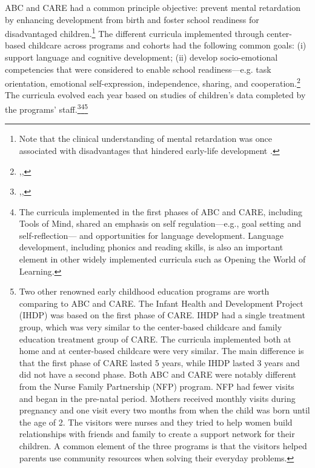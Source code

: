 \noindent ABC and CARE had a common principle objective: prevent mental retardation by enhancing development from birth and foster school readiness for disadvantaged children.\footnote{Note that the clinical understanding of mental retardation was once associated with disadvantages that hindered early-life development \citep{Mental-Retardation_America_2004_BOOK_NYU}.} The different curricula implemented through center-based childcare across programs and cohorts had the following common goals: (i) support language and cognitive development; (ii) develop socio-emotional competencies that were considered to enable school readiness---e.g. task orientation, emotional self-expression, independence, sharing, and cooperation.\footnote{\citet{Sparling_1974_Synth_Edu_Infant_SPEECH},\citet{Ramey_Collier_etal_1976_CarolinaAbecedarianProject},\citet{Ramey-etal_2012-ABC}} The curricula evolved each year based on studies of children's data completed by the programs' staff.\footnote{\citet{Ramey-etal_1975_AJoMD},\citet{Finkelstein_1982_Day_Care_YC},\citet{Haskins_1985_CD}}\footnote{The curricula implemented in the first phases of ABC and CARE, including Tools of Mind, shared an emphasis on self regulation---e.g., goal setting and self-reflection--- and opportunities for language development. Language development, including phonics and reading skills, is also an important element in other widely implemented curricula such as Opening the World of Learning.}\footnote{Two other renowned early childhood education programs are worth comparing to ABC and CARE. The Infant Health and Development Project (IHDP) was based on the first phase of CARE. IHDP had a single treatment group, which was very similar to the center-based childcare and family education treatment group of CARE. The curricula implemented both at home and at center-based childcare were very similar. The main difference is that the first phase of CARE lasted 5 years, while IHDP lasted 3 years and did not have a second phase. Both ABC and CARE were notably different from the Nurse Family Partnership (NFP) program. NFP had fewer visits and began in the pre-natal period. Mothers received monthly visits during pregnancy and one visit every two months from when the child was born until the age of 2. The visitors were nurses and they tried to help women build relationships with friends and family to create a support network for their children. A common element of the three programs is that the visitors helped parents use community resources when solving their everyday problems.}\\

